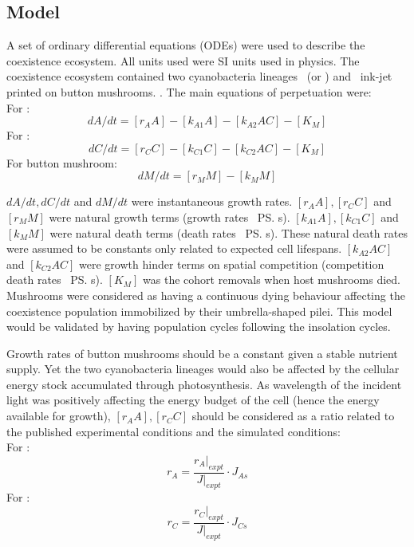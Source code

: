 \documentclass[../thesis.tex]{subfiles} %
\begin{document}
\subsection{Model}
A set of ordinary differential equations (ODEs) were used to describe the coexistence ecosystem.  All units used were SI units used in physics.  The coexistence ecosystem contained two cyanobacteria lineages \As\ (or \Ss) and \Cs\ ink-jet printed on button mushrooms.\autocite{joshi2018bacterial} . The main equations of perpetuation were:\\
For \As:
\begin{equation}
	dA/dt = [r_A A] - [k_{A1} A] - [k_{A2} A C] - [K_M]
\end{equation}
For \Cs:
\begin{equation}
	dC/dt = [r_C C] - [k_{C1} C] - [k_{C2} A C] - [K_M]
\end{equation}
For button mushroom:
\begin{equation}
	dM/dt = [r_M M] - [k_M M]
\end{equation}

$dA/dt, dC/dt$ and $dM/dt$ were instantaneous growth rates.  $[r_A A], [r_C C]$ and $[r_M M]$ were natural growth terms (growth rates \times\ \ps s).  $[k_{A1} A], [k_{C1} C]$ and $[k_M M]$ were natural death terms (death rates \times\ \ps s).  These natural death rates were assumed to be constants only related to expected cell lifespans.  $[k_{A2} A C]$ and $[k_{C2} A C]$ were growth hinder terms on spatial competition (competition death rates \times\ \ps s).  $[K_M]$ was the cohort removals when host mushrooms died.  Mushrooms were considered as having a continuous dying behaviour affecting the coexistence population immobilized by their umbrella-shaped pilei.  This model would be validated by having population cycles following the insolation cycles.

Growth rates of button mushrooms should be a constant given a stable nutrient supply.  Yet the two cyanobacteria lineages would also be affected by the cellular energy stock accumulated through photosynthesis.  As wavelength of the incident light was positively affecting the energy budget of the cell (hence the energy available for growth), $[r_A A], [r_C C]$ should be considered as a ratio related to the published experimental conditions and the simulated conditions:\\
For \As:
\begin{equation}
    r_A = \dfrac{r_A|_{expt}}{J|_{expt}}\cdot J_{As}
\end{equation}
For \Cs:
\begin{equation}
    r_C = \dfrac{r_C|_{expt}}{J|_{expt}}\cdot J_{Cs}
\end{equation}
\end{document}
